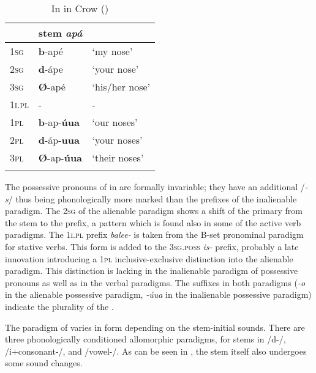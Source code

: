 \documentclass[output=paper]{LSP/langsci}
\begin{document}
\begin{table}
\caption{In in Crow (\citealt[52]{Graczyk2007})} \label{crowinalienablepossession}
\begin{tabular}{ l l l }
\lsptoprule
& stem \textit{apá}  & \\
\midrule	
\textsc{1sg} & \textbf{b}-apé & `my nose' \\
 
\textsc{2sg} & \textbf{d}-ápe	 & `your nose' \\
 
\textsc{3sg} & \textbf{Ø}-apé & `his/her nose' \\
 
\textsc{1i.pl}	& -	& - \\
 
\textsc{1pl} & \textbf{b}-ap-\textbf{úua}	& `our noses' \\
 
\textsc{2pl} & \textbf{d}-áp-\textbf{uua}	& `your noses' \\
 
\textsc{3pl} & \textbf{Ø}-ap-\textbf{úua}	& `their noses' \\
\lspbottomrule
\end{tabular}
\end{table}

The possessive pronouns of  in  are formally invariable; they have an additional /\textit{-s}/ thus being phonologically more marked than the prefixes of the inalienable paradigm. The \textsc{2sg}  of the alienable paradigm shows a shift of the primary  from the stem to the prefix, a pattern which is found also in some of the active verb paradigms. The \textsc{1i.pl} prefix \textit{balee-} is taken from the B-set pronominal paradigm for stative verbs. This form is added to the \textsc{3sg.poss} \textit{is-} prefix, probably a late innovation introducing a \textsc{1pl} inclusive-exclusive distinction into the alienable paradigm. This distinction is lacking in the inalienable paradigm of possessive pronouns as well as in the verbal paradigms. The suffixes in both paradigms (\textit{-o} in the alienable possessive paradigm, \textit{-úua} in the inalienable possessive paradigm) indicate the plurality of the .

The paradigm of  varies in form depending on the stem-initial sounds. There are three phonologically conditioned allomorphic paradigms, for stems in /d-/, /i+consonant-/, and /vowel-/. As can be seen in , the stem itself also undergoes some sound changes.
\end{document}
